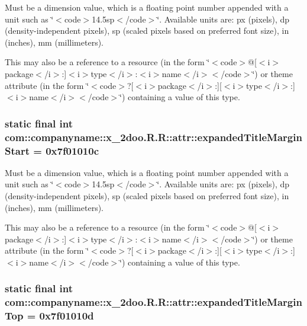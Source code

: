 Must be a dimension value, which is a floating point number appended with a unit such as \char`\"{}$<$code$>$14.5sp$<$/code$>$\char`\"{}. Available units are: px (pixels), dp (density-independent pixels), sp (scaled pixels based on preferred font size), in (inches), mm (millimeters). 

This may also be a reference to a resource (in the form \char`\"{}$<$code$>$@\mbox{[}$<$i$>$package$<$/i$>$:\mbox{]}$<$i$>$type$<$/i$>$:$<$i$>$name$<$/i$>$$<$/code$>$\char`\"{}) or theme attribute (in the form \char`\"{}$<$code$>$?\mbox{[}$<$i$>$package$<$/i$>$:\mbox{]}\mbox{[}$<$i$>$type$<$/i$>$:\mbox{]}$<$i$>$name$<$/i$>$$<$/code$>$\char`\"{}) containing a value of this type. \hypertarget{classcom_1_1companyname_1_1x__2doo_1_1_r_1_1attr_c3387d729c190f1814da7e38ded19f7f}{
\subsubsection[{expandedTitleMarginStart}]{\setlength{\rightskip}{0pt plus 5cm}static final int com::companyname::x\_\-2doo.R.R::attr::expandedTitleMarginStart = 0x7f01010c}}
\label{classcom_1_1companyname_1_1x__2doo_1_1_r_1_1attr_c3387d729c190f1814da7e38ded19f7f}


Must be a dimension value, which is a floating point number appended with a unit such as \char`\"{}$<$code$>$14.5sp$<$/code$>$\char`\"{}. Available units are: px (pixels), dp (density-independent pixels), sp (scaled pixels based on preferred font size), in (inches), mm (millimeters). 

This may also be a reference to a resource (in the form \char`\"{}$<$code$>$@\mbox{[}$<$i$>$package$<$/i$>$:\mbox{]}$<$i$>$type$<$/i$>$:$<$i$>$name$<$/i$>$$<$/code$>$\char`\"{}) or theme attribute (in the form \char`\"{}$<$code$>$?\mbox{[}$<$i$>$package$<$/i$>$:\mbox{]}\mbox{[}$<$i$>$type$<$/i$>$:\mbox{]}$<$i$>$name$<$/i$>$$<$/code$>$\char`\"{}) containing a value of this type. \hypertarget{classcom_1_1companyname_1_1x__2doo_1_1_r_1_1attr_68db3745bedf6a114ea2dd7004dff985}{
\subsubsection[{expandedTitleMarginTop}]{\setlength{\rightskip}{0pt plus 5cm}static final int com::companyname::x\_\-2doo.R.R::attr::expandedTitleMarginTop = 0x7f01010d}}
\label{classcom_1_1companyname_1_1x__2doo_1_1_r_1_1attr_68db3745bedf6a114ea2dd7004dff985}


